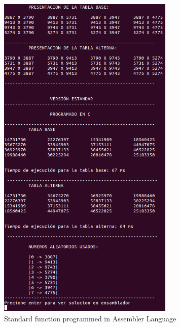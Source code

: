 \documentclass[legalpaper,12pt]{article}
\begin{document}
\begin{figure}[htbp]
  \centering
    \includegraphics[width=0.75\textwidth]{Normal_C.png}
  \caption{Standard function programmed in Assembler Language}
  \label{fig:normal_c}
\end{figure}
\end{document}

